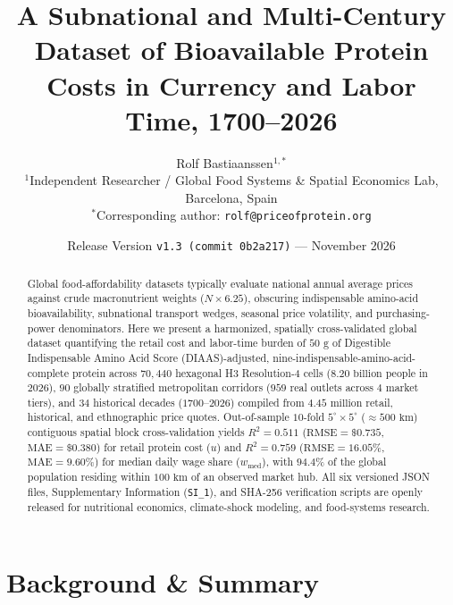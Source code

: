 \documentclass[11pt,a4paper]{article}
\title{\textbf{A Subnational and Multi-Century Dataset of Bioavailable Protein Costs in Currency and Labor Time, 1700--2026}}
\author{
Rolf Bastiaanssen$^{1,*}$ \\
\small $^{1}$Independent Researcher / Global Food Systems \& Spatial Economics Lab, Barcelona, Spain \\
\small $^{*}$Corresponding author: \texttt{rolf@priceofprotein.org}
}
\date{Release Version \texttt{v1.3 (commit 0b2a217)} --- November 2026}
\begin{document}
\maketitle

\begin{abstract}
Global food-affordability datasets typically evaluate national annual average prices against crude macronutrient weights ($N \times 6.25$), obscuring indispensable amino-acid bioavailability, subnational transport wedges, seasonal price volatility, and purchasing-power denominators. Here we present a harmonized, spatially cross-validated global dataset quantifying the retail cost and labor-time burden of $50\text{ g}$ of Digestible Indispensable Amino Acid Score (DIAAS)-adjusted, nine-indispensable-amino-acid-complete protein across $70{,}440$ hexagonal H3 Resolution-4 cells ($8.20\text{ billion}$ people in $2026$), $90$ globally stratified metropolitan corridors ($959$ real outlets across $4$ market tiers), and $34$ historical decades ($1700\text{--}2026$) compiled from $4.45\text{ million}$ retail, historical, and ethnographic price quotes. Out-of-sample $10$-fold $5^\circ \times 5^\circ$ ($\approx 500\text{ km}$) contiguous spatial block cross-validation yields $R^2 = 0.511$ ($\text{RMSE} = \$0.735$, $\text{MAE} = \$0.380$) for retail protein cost ($u$) and $R^2 = 0.759$ ($\text{RMSE} = 16.05\%$, $\text{MAE} = 9.60\%$) for median daily wage share ($w_{\text{med}}$), with $94.4\%$ of the global population residing within $100\text{ km}$ of an observed market hub. All six versioned JSON files, Supplementary Information (\texttt{SI\_1}), and SHA-256 verification scripts are openly released for nutritional economics, climate-shock modeling, and food-systems research.
\end{abstract}

\section{Background \& Summary}
\end{document}
